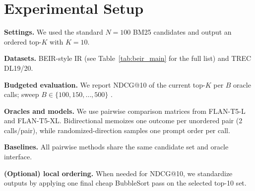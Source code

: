 \documentclass[11pt]{article}
\begin{document}



\section{Experimental Setup}

\noindent\textbf{Settings.} We used the standard $N{=}100$ BM25 candidates and output an ordered top-$K$ with $K{=}10$.

\noindent\textbf{Datasets.} BEIR-style IR (see Table~\ref{tab:beir_main} for the full list) and TREC DL19/20.

\noindent\textbf{Budgeted evaluation.}
We report NDCG@10  of the current top-$K$ per $B$ oracle calls; sweep $B\in\{100,150,\dots,500\}$ .

\noindent\textbf{Oracles and models.}
We use pairwise comparison matrices from FLAN-T5-L and FLAN-T5-XL.
Bidirectional memoizes one outcome per unordered pair (2 calls/pair), while randomized-direction samples one prompt order per call.

\noindent\textbf{Baselines.}
All pairwise methods share the same candidate set and oracle interface.

\noindent\textbf{(Optional) local ordering.}
When needed for NDCG@10, we standardize outputs by applying one final cheap BubbleSort pass on the selected top-10 set.

\end{document}
